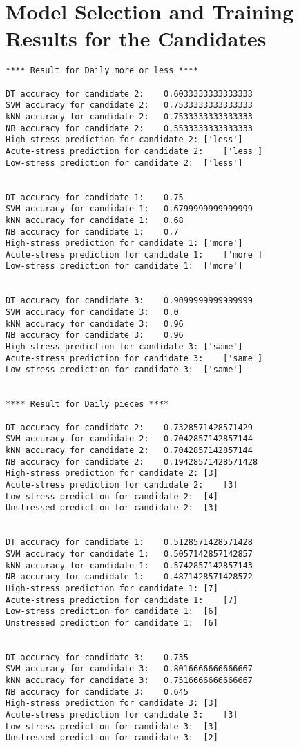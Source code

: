\chapter{Model Selection and Training Results for the Candidates}\label{training-result}
\begin{lstlisting}
**** Result for Daily more_or_less ****

DT accuracy for candidate 2:	0.6033333333333333
SVM accuracy for candidate 2:	0.7533333333333333
kNN accuracy for candidate 2:	0.7533333333333333
NB accuracy for candidate 2:	0.5533333333333333
High-stress prediction for candidate 2:	['less']
Acute-stress prediction for candidate 2:	['less']
Low-stress prediction for candidate 2:	['less']


DT accuracy for candidate 1:	0.75
SVM accuracy for candidate 1:	0.6799999999999999
kNN accuracy for candidate 1:	0.68
NB accuracy for candidate 1:	0.7
High-stress prediction for candidate 1:	['more']
Acute-stress prediction for candidate 1:	['more']
Low-stress prediction for candidate 1:	['more']


DT accuracy for candidate 3:	0.9099999999999999
SVM accuracy for candidate 3:	0.0
kNN accuracy for candidate 3:	0.96
NB accuracy for candidate 3:	0.96
High-stress prediction for candidate 3:	['same']
Acute-stress prediction for candidate 3:	['same']
Low-stress prediction for candidate 3:	['same']


**** Result for Daily pieces ****

DT accuracy for candidate 2:	0.7328571428571429
SVM accuracy for candidate 2:	0.7042857142857144
kNN accuracy for candidate 2:	0.7042857142857144
NB accuracy for candidate 2:	0.19428571428571428
High-stress prediction for candidate 2:	[3]
Acute-stress prediction for candidate 2:	[3]
Low-stress prediction for candidate 2:	[4]
Unstressed prediction for candidate 2:	[3]


DT accuracy for candidate 1:	0.5128571428571428
SVM accuracy for candidate 1:	0.5057142857142857
kNN accuracy for candidate 1:	0.5742857142857143
NB accuracy for candidate 1:	0.4871428571428572
High-stress prediction for candidate 1:	[7]
Acute-stress prediction for candidate 1:	[7]
Low-stress prediction for candidate 1:	[6]
Unstressed prediction for candidate 1:	[6]


DT accuracy for candidate 3:	0.735
SVM accuracy for candidate 3:	0.8016666666666667
kNN accuracy for candidate 3:	0.7516666666666667
NB accuracy for candidate 3:	0.645
High-stress prediction for candidate 3:	[3]
Acute-stress prediction for candidate 3:	[3]
Low-stress prediction for candidate 3:	[3]
Unstressed prediction for candidate 3:	[2]



\end{lstlisting}

